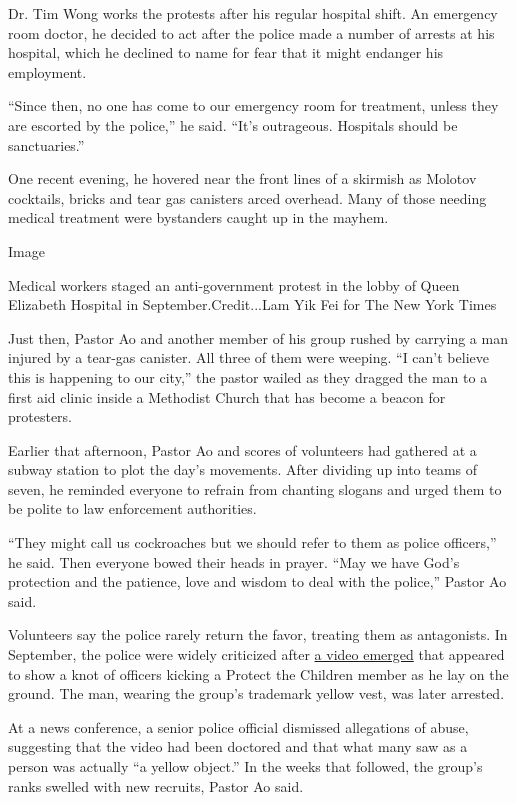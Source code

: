Dr. Tim Wong works the protests after his regular hospital shift. An
emergency room doctor, he decided to act after the police made a number
of arrests at his hospital, which he declined to name for fear that it
might endanger his employment.

``Since then, no one has come to our emergency room for treatment,
unless they are escorted by the police,'' he said. ``It's outrageous.
Hospitals should be sanctuaries.''

One recent evening, he hovered near the front lines of a skirmish as
Molotov cocktails, bricks and tear gas canisters arced overhead. Many of
those needing medical treatment were bystanders caught up in the mayhem.

Image

Medical workers staged an anti-government protest in the lobby of Queen
Elizabeth Hospital in September.Credit...Lam Yik Fei for The New York
Times

Just then, Pastor Ao and another member of his group rushed by carrying
a man injured by a tear-gas canister. All three of them were weeping.
``I can't believe this is happening to our city,'' the pastor wailed as
they dragged the man to a first aid clinic inside a Methodist Church
that has become a beacon for protesters.

Earlier that afternoon, Pastor Ao and scores of volunteers had gathered
at a subway station to plot the day's movements. After dividing up into
teams of seven, he reminded everyone to refrain from chanting slogans
and urged them to be polite to law enforcement authorities.

``They might call us cockroaches but we should refer to them as police
officers,'' he said. Then everyone bowed their heads in prayer. ``May we
have God's protection and the patience, love and wisdom to deal with the
police,'' Pastor Ao said.

Volunteers say the police rarely return the favor, treating them as
antagonists. In September, the police were widely criticized after
\href{https://www.nytimes.com/2019/09/24/world/asia/hong-kong-yellow-object.html}{a
video emerged} that appeared to show a knot of officers kicking a
Protect the Children member as he lay on the ground. The man, wearing
the group's trademark yellow vest, was later arrested.

At a news conference, a senior police official dismissed allegations of
abuse, suggesting that the video had been doctored and that what many
saw as a person was actually ``a yellow object.'' In the weeks that
followed, the group's ranks swelled with new recruits, Pastor Ao said.

